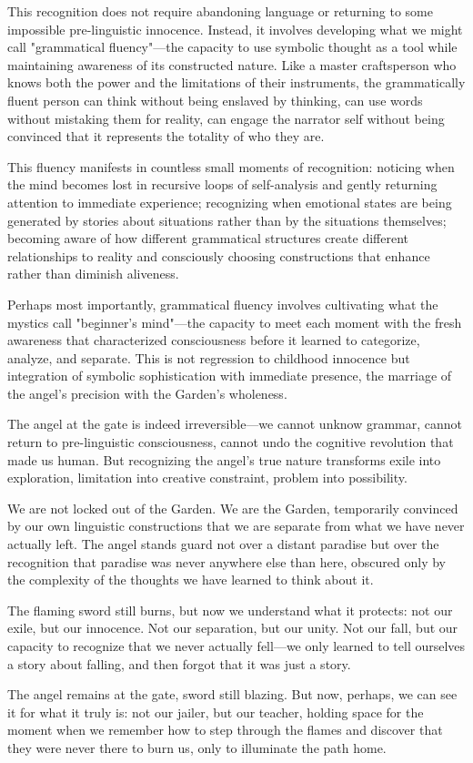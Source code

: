 This recognition does not require abandoning language or returning to some impossible pre-linguistic innocence. Instead, it involves developing what we might call "grammatical fluency"—the capacity to use symbolic thought as a tool while maintaining awareness of its constructed nature. Like a master craftsperson who knows both the power and the limitations of their instruments, the grammatically fluent person can think without being enslaved by thinking, can use words without mistaking them for reality, can engage the narrator self without being convinced that it represents the totality of who they are.

This fluency manifests in countless small moments of recognition: noticing when the mind becomes lost in recursive loops of self-analysis and gently returning attention to immediate experience; recognizing when emotional states are being generated by stories about situations rather than by the situations themselves; becoming aware of how different grammatical structures create different relationships to reality and consciously choosing constructions that enhance rather than diminish aliveness.

Perhaps most importantly, grammatical fluency involves cultivating what the mystics call "beginner's mind"—the capacity to meet each moment with the fresh awareness that characterized consciousness before it learned to categorize, analyze, and separate. This is not regression to childhood innocence but integration of symbolic sophistication with immediate presence, the marriage of the angel's precision with the Garden's wholeness.

The angel at the gate is indeed irreversible—we cannot unknow grammar, cannot return to pre-linguistic consciousness, cannot undo the cognitive revolution that made us human. But recognizing the angel's true nature transforms exile into exploration, limitation into creative constraint, problem into possibility.

We are not locked out of the Garden. We are the Garden, temporarily convinced by our own linguistic constructions that we are separate from what we have never actually left. The angel stands guard not over a distant paradise but over the recognition that paradise was never anywhere else than here, obscured only by the complexity of the thoughts we have learned to think about it.

The flaming sword still burns, but now we understand what it protects: not our exile, but our innocence. Not our separation, but our unity. Not our fall, but our capacity to recognize that we never actually fell—we only learned to tell ourselves a story about falling, and then forgot that it was just a story.

The angel remains at the gate, sword still blazing. But now, perhaps, we can see it for what it truly is: not our jailer, but our teacher, holding space for the moment when we remember how to step through the flames and discover that they were never there to burn us, only to illuminate the path home.
